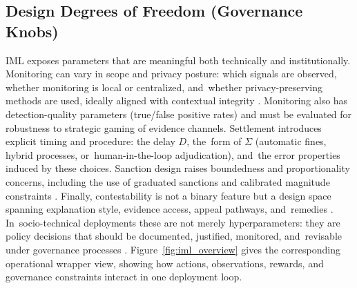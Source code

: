 \documentclass[mca,article,accept,pdftex,oneauthor]{Definitions/mdpi}
\begin{document}
\subsection{Design Degrees of Freedom (Governance Knobs)}
\label{sec:dofs}

IML exposes parameters that are meaningful both technically and institutionally. Monitoring can vary in scope and privacy posture: which signals are observed, whether monitoring is local or centralized, and~whether privacy-preserving methods are used, ideally aligned with contextual integrity \citep{Nissenbaum2004}. Monitoring also has detection-quality parameters (true/false positive rates) and must be evaluated for robustness to strategic gaming of evidence channels. Settlement introduces explicit timing and procedure: the delay $D$, the~form of $\Sigma$ (automatic fines, hybrid processes, or~human-in-the-loop adjudication), and~the error properties induced by these choices. Sanction design raises boundedness and proportionality concerns, including the use of graduated sanctions and calibrated magnitude constraints \citep{Ostrom1990}. Finally, contestability is not a binary feature but a design space spanning explanation style, evidence access, appeal pathways, and~remedies \citep{Lee2019ProceduralJustice,Kroll2017AccountableAlgorithms}. In~socio-technical deployments these are not merely hyperparameters: they are policy decisions that should be documented, justified, monitored, and~revisable under governance processes \citep{NIST2023AIRMF,ISO23894}.
Figure~\ref{fig:iml_overview} gives the corresponding operational wrapper view, showing how actions, observations, rewards, and governance constraints interact in one deployment loop.

\end{document}
